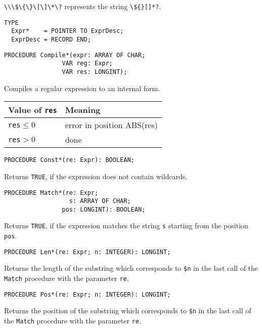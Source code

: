 \verb|\\\$\{\}\[\]\*\?| represents the string \verb|\${}[]*?|.

{\samepage
{}
\begin{verbatim}
TYPE
  Expr*    = POINTER TO ExprDesc;
  ExprDesc = RECORD END;
\end{verbatim}
}
\ModuleList

{\samepage
{}
\begin{verbatim}
PROCEDURE Compile*(expr: ARRAY OF CHAR;
                VAR reg: Expr;
                VAR res: LONGINT);
\end{verbatim}
}
\ModuleList
Compiles a regular expression to an internal form.
\begin{flushleft}
\begin{tabular}{l|l}
Value of {\tt res} & Meaning \\ \hline
  {\tt res}$\leq 0$ & error in position ABS(res) \\
  {\tt res}$ > 0$   & done                       \\
\end{tabular}
\end{flushleft}

{\samepage
{}
\begin{verbatim}
PROCEDURE Const*(re: Expr): BOOLEAN;
\end{verbatim}
}
\ModuleList
Returns \verb'TRUE', if the expression does not contain wildcards.

{\samepage
{}
\begin{verbatim}
PROCEDURE Match*(re: Expr;
                  s: ARRAY OF CHAR;
                pos: LONGINT): BOOLEAN;
\end{verbatim}
}
\ModuleList
Returns \verb'TRUE', if the expression matches the string {\tt s} starting
from the position {\tt pos}.

{\samepage
{}
\begin{verbatim}
PROCEDURE Len*(re: Expr; n: INTEGER): LONGINT;
\end{verbatim}
}
\ModuleList
Returns the length of the substring which corresponds to \verb|$n|
in the last call of the {\tt Match} procedure with the parameter {\tt re}.

{\samepage
{}
\begin{verbatim}
PROCEDURE Pos*(re: Expr; n: INTEGER): LONGINT;
\end{verbatim}
}
\ModuleList
Returns the position of the substring which
corresponds to \verb|$n| in the last call of
the {\tt Match} procedure with the parameter {\tt re}.

